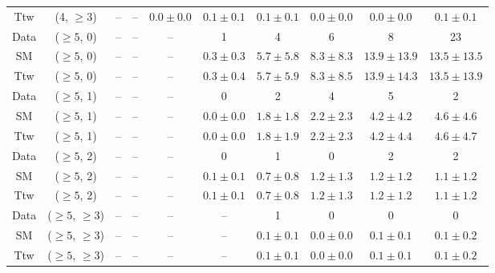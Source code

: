 \begin{table}[h!]
{\begin{tabular}{cccccccccc}
	Ttw & (4, $\ge3$) & -- & -- & $0.0\pm 0.0$ & $0.1\pm 0.1$ & $0.1\pm 0.1$ & $0.0\pm 0.0$ & $0.0\pm 0.0$ & $0.1\pm 0.1$ \\[0.5ex] 
	Data & ($\ge5$, 0) & -- & -- & -- & 1 & 4 & 6 & 8 & 23 \\[0.5ex] 
	SM & ($\ge5$, 0) & -- & -- & -- & $0.3\pm 0.3$ & $5.7\pm 5.8$ & $8.3\pm 8.3$ & $13.9\pm 13.9$ & $13.5\pm 13.5$ \\[0.5ex] 
	Ttw & ($\ge5$, 0) & -- & -- & -- & $0.3\pm 0.4$ & $5.7\pm 5.9$ & $8.3\pm 8.5$ & $13.9\pm 14.3$ & $13.5\pm 13.9$ \\[0.5ex] 
	Data & ($\ge5$, 1) & -- & -- & -- & 0 & 2 & 4 & 5 & 2 \\[0.5ex] 
	SM & ($\ge5$, 1) & -- & -- & -- & $0.0\pm 0.0$ & $1.8\pm 1.8$ & $2.2\pm 2.3$ & $4.2\pm 4.2$ & $4.6\pm 4.6$ \\[0.5ex] 
	Ttw & ($\ge5$, 1) & -- & -- & -- & $0.0\pm 0.0$ & $1.8\pm 1.9$ & $2.2\pm 2.3$ & $4.2\pm 4.4$ & $4.6\pm 4.7$ \\[0.5ex] 
	Data & ($\ge5$, 2) & -- & -- & -- & 0 & 1 & 0 & 2 & 2 \\[0.5ex] 
	SM & ($\ge5$, 2) & -- & -- & -- & $0.1\pm 0.1$ & $0.7\pm 0.8$ & $1.2\pm 1.3$ & $1.2\pm 1.2$ & $1.1\pm 1.2$ \\[0.5ex] 
	Ttw & ($\ge5$, 2) & -- & -- & -- & $0.1\pm 0.1$ & $0.7\pm 0.8$ & $1.2\pm 1.3$ & $1.2\pm 1.2$ & $1.1\pm 1.2$ \\[0.5ex] 
	Data & ($\ge5$, $\ge3$) & -- & -- & -- & -- & 1 & 0 & 0 & 0 \\[0.5ex] 
	SM & ($\ge5$, $\ge3$) & -- & -- & -- & -- & $0.1\pm 0.1$ & $0.0\pm 0.0$ & $0.1\pm 0.1$ & $0.1\pm 0.2$ \\[0.5ex] 
	Ttw & ($\ge5$, $\ge3$) & -- & -- & -- & -- & $0.1\pm 0.1$ & $0.0\pm 0.0$ & $0.1\pm 0.1$ & $0.1\pm 0.2$ \\[0.5ex] 
	\hline
	\hline
\end{tabular}}
\end{table}
